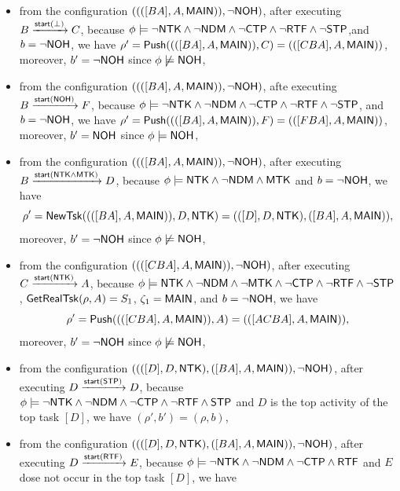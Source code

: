 \begin{example}
{\begin{itemize}
	\item from the configuration $((([BA], A, {\sf MAIN})),\neg {\sf NOH})$, after executing $B\xrightarrow{{\mathsf{start} }(\bot)}C$, because $\phi\models\neg{\sf NTK}\wedge\neg{\sf NDM}\wedge\neg{\sf CTP}\wedge\neg{\sf RTF}\wedge\neg{\sf STP}$,and $b=\neg{\sf NOH}$, we have $\rho' = \mathsf{Push}((([BA], A, {\sf MAIN})), C) = (([CBA], A, {\sf MAIN}))$, moreover, $b' = \neg {\sf NOH}$ since $\phi \not \models {\sf NOH}$,
	\item from the configuration $((([BA], A, {\sf MAIN})),\neg {\sf NOH})$, afte executing $B\xrightarrow{{\mathsf{start} }({\sf NOH})}F$, because $\phi\models\neg{\sf NTK}\wedge\neg{\sf NDM}\wedge\neg{\sf CTP}\wedge\neg{\sf RTF}\wedge\neg{\sf STP}$, and $b = \neg{\sf NOH}$, we have $\rho' = \mathsf{Push}((([BA], A, {\sf MAIN})), F) = (([FBA], A, {\sf MAIN}))$, moreover, $b' = {\sf NOH}$ since $\phi \models {\sf NOH}$,
		\item from the configuration $((([BA], A, {\sf MAIN})),\neg {\sf NOH})$, after executing $B\xrightarrow{{\mathsf{start} }({\sf NTK}\wedge{\sf MTK})}D$, because $\phi\models{\sf NTK}\wedge\neg{\sf NDM}\wedge{\sf MTK}$ and $b = \neg{\sf NOH}$, we have 
		$$\rho' = \mathsf{NewTsk}((([BA], A, {\sf MAIN})), D, {\sf NTK}) = (([D],D,{\sf NTK}),([BA], A, {\sf MAIN})),$$ 
	moreover, $b' = \neg {\sf NOH}$ since $\phi \not \models {\sf NOH}$,
        \item from the configuration $((([CBA], A, {\sf MAIN})), \neg {\sf NOH})$, after executing $C \xrightarrow{{\mathsf{start} }({\sf NTK})} A$, because $\phi\models{\sf NTK}\wedge\neg{\sf NDM}\wedge\neg{\sf MTK}\wedge\neg{\sf CTP}\wedge\neg{\sf RTF}\wedge\neg{\sf STP}$, $\mathsf{GetRealTsk}(\rho,A) = S_1$, $\zeta_1 = {\sf MAIN}$, and $b = \neg {\sf NOH}$, we have 
		$$\rho' = \mathsf{Push}((([CBA], A, {\sf MAIN})), A) = (([ACBA], A, {\sf MAIN})),$$
		 moreover, $b' = \neg {\sf NOH}$ since $\phi \not \models {\sf NOH}$,
        \item from the configuration $((([D],D,{\sf NTK}),([BA], A, {\sf MAIN})),\neg{\sf NOH})$,  after executing  $D \xrightarrow{{\mathsf{start} }({\sf STP})} D$, because $\phi \models \neg {\sf NTK} \wedge \neg {\sf NDM}\wedge\neg{\sf CTP}\wedge\neg{\sf RTF}\wedge{\sf STP}$ and $D$ is the top activity of the top task $[D]$, we have $(\rho',b') = (\rho,b)$,
        \item from the configuration $((([D],D,{\sf NTK}),([BA], A, {\sf MAIN})),\neg{\sf NOH})$, after executing $D \xrightarrow{{\mathsf{start} }({\sf RTF})} E$, because $\phi \models \neg {\sf NTK} \wedge \neg {\sf NDM}\wedge\neg{\sf CTP}\wedge{\sf RTF}$ and $E$ dose not occur in the top task $[D]$, we have 

\end{itemize}}
\end{example}
